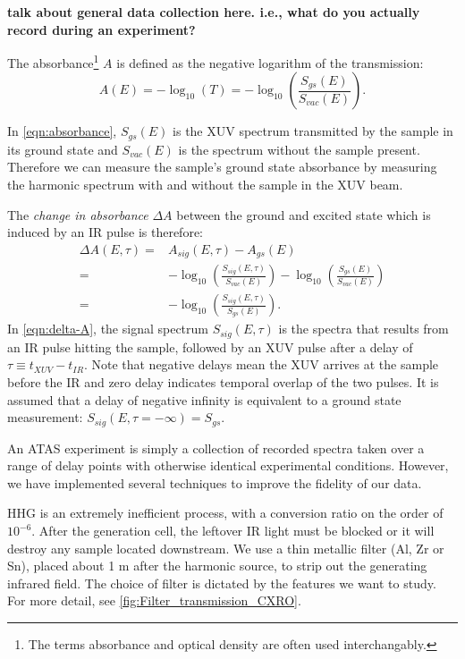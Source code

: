 \textbf{talk about general data collection here. i.e., what do you actually record during an experiment?}

The absorbance\footnote{The terms absorbance and optical density are often used interchangably.} $A$ is defined as the negative logarithm of the transmission:
\begin{equation}
A(E) = -\log_{10} \left( T \right) = -\log_{10} \left(\frac{S_{gs}(E)}{S_{vac}(E)} \right).
\label{eqn:absorbance}
\end{equation}

In \cref{eqn:absorbance}, $S_{gs}(E)$ is the XUV spectrum transmitted by the sample in its ground state and $S_{vac}(E)$ is the spectrum without the sample present. Therefore we can measure the sample's ground state absorbance by measuring the harmonic spectrum with and without the sample in the XUV beam.

The \textit{change in absorbance} $\Delta A$ between the ground and excited state which is induced by an IR pulse is therefore:
\begin{equation}
\begin{aligned}
\Delta A(E,\tau) = & A_{sig}(E,\tau) - A_{gs}(E) \\
= & -\log_{10} \left(\frac{S_{sig}(E,\tau)}{S_{vac}(E)} \right) -  \log_{10} \left(\frac{S_{gs}(E)}{S_{vac}(E)} \right) \\
= & -\log_{10} \left(\frac{S_{sig}(E,\tau)}{S_{gs}(E)} \right).
\end{aligned}
\label{eqn:delta-A}
\end{equation}
In \cref{eqn:delta-A}, the signal spectrum $S_{sig}(E,\tau)$ is the spectra that results from an IR pulse hitting the sample, followed by an XUV pulse after a delay of $\tau \equiv t_{XUV} - t_{IR}$. Note that negative delays mean the XUV arrives at the sample before the IR and zero delay indicates temporal overlap of the two pulses. It is assumed that a delay of negative infinity is equivalent to a ground state measurement: $S_{sig}(E,\tau=-\infty) = S_{gs}$.

An ATAS experiment is simply a collection of recorded spectra taken over a range of delay points with otherwise identical experimental conditions. However, we have implemented several techniques to improve the fidelity of our data.

HHG is an extremely inefficient process, with a conversion ratio on the order of $10^{-6}$. After the generation cell, the leftover IR light must be blocked or it will destroy any sample located downstream. We use a thin metallic filter (Al, Zr or Sn), placed about 1 m after the harmonic source, to strip out the generating infrared field. The choice of filter is dictated by the features we want to study. For more detail, see \cref{fig:Filter_transmission_CXRO}.

